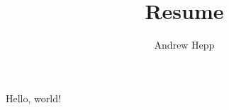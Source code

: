 \documentclass{article}
\title{Resume}
\author{Andrew Hepp}
\begin{document}
    Hello, world!
\end{document}
